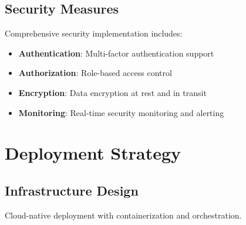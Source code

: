 \documentclass[11pt,a4paper,oneside]{article}
\begin{document}
\subsection{Security Measures}

Comprehensive security implementation includes:

\begin{itemize}
\item \textbf{Authentication}: Multi-factor authentication support
\item \textbf{Authorization}: Role-based access control
\item \textbf{Encryption}: Data encryption at rest and in transit
\item \textbf{Monitoring}: Real-time security monitoring and alerting
\end{itemize}

\section{Deployment Strategy}

\subsection{Infrastructure Design}

Cloud-native deployment with containerization and orchestration.
\end{document}
